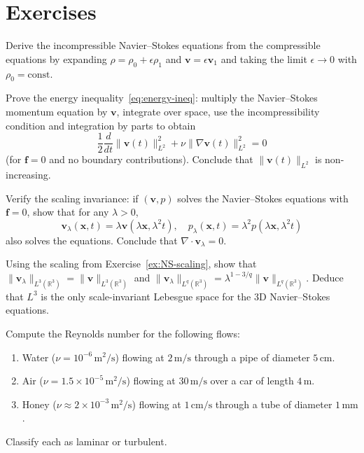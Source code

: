\section{Exercises}

\begin{exercise}
\label{ex:NS-derive}
Derive the incompressible Navier--Stokes equations from the compressible equations by expanding $\rho = \rho_0 + \epsilon \rho_1$ and $\mathbf{v} = \epsilon \mathbf{v}_1$ and taking the limit $\epsilon \to 0$ with $\rho_0 = \text{const}$.
\end{exercise}

\begin{exercise}
\label{ex:NS-energy}
Prove the energy inequality~\eqref{eq:energy-ineq}: multiply the Navier--Stokes momentum equation by $\mathbf{v}$, integrate over space, use the incompressibility condition and integration by parts to obtain
\[
\frac{1}{2} \frac{d}{dt} \|\mathbf{v}(t)\|_{L^2}^2 + \nu \|\nabla \mathbf{v}(t)\|_{L^2}^2 = 0
\]
(for $\mathbf{f} = 0$ and no boundary contributions). Conclude that $\|\mathbf{v}(t)\|_{L^2}$ is non-increasing.
\end{exercise}

\begin{exercise}
\label{ex:NS-scaling}
Verify the scaling invariance: if $(\mathbf{v}, p)$ solves the Navier--Stokes equations with $\mathbf{f} = 0$, show that for any $\lambda > 0$,
\[
\mathbf{v}_\lambda(\mathbf{x}, t) = \lambda \mathbf{v}(\lambda \mathbf{x}, \lambda^2 t), \quad p_\lambda(\mathbf{x}, t) = \lambda^2 p(\lambda \mathbf{x}, \lambda^2 t)
\]
also solves the equations. Conclude that $\nabla \cdot \mathbf{v}_\lambda = 0$.
\end{exercise}

\begin{exercise}
\label{ex:NS-scale-L3}
Using the scaling from Exercise~\ref{ex:NS-scaling}, show that $\|\mathbf{v}_\lambda\|_{L^3(\mathbb{R}^3)} = \|\mathbf{v}\|_{L^3(\mathbb{R}^3)}$ and $\|\mathbf{v}_\lambda\|_{L^q(\mathbb{R}^3)} = \lambda^{1-3/q}\|\mathbf{v}\|_{L^q(\mathbb{R}^3)}$. Deduce that $L^3$ is the only scale-invariant Lebesgue space for the 3D Navier--Stokes equations.
\end{exercise}

\begin{exercise}
\label{ex:NS-Reynolds}
Compute the Reynolds number for the following flows:
\begin{enumerate}
\item Water ($\nu = 10^{-6} \, \text{m}^2/\text{s}$) flowing at $2 \, \text{m/s}$ through a pipe of diameter $5 \, \text{cm}$.
\item Air ($\nu = 1.5 \times 10^{-5} \, \text{m}^2/\text{s}$) flowing at $30 \, \text{m/s}$ over a car of length $4 \, \text{m}$.
\item Honey ($\nu \approx 2 \times 10^{-3} \, \text{m}^2/\text{s}$) flowing at $1 \, \text{cm/s}$ through a tube of diameter $1 \, \text{mm}$.
\end{enumerate}
Classify each as laminar or turbulent.
\end{exercise}

